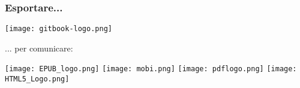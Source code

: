 \begin{frame}
\frametitle{Esportare...}
\begin{center}
\vspace{-2.24cm}
\texttt{[image: gitbook-logo.png]}
\end{center}
\vspace{-1cm}
... per comunicare:
\vspace{1cm}
\begin{center}
\texttt{[image: EPUB\_logo.png]}
\hspace{0.7cm}
\texttt{[image: mobi.png]}
\hspace{0.75cm}
\texttt{[image: pdflogo.png]}
\hspace{0.75cm}
\texttt{[image: HTML5\_Logo.png]}
\end{center}
\end{frame}
